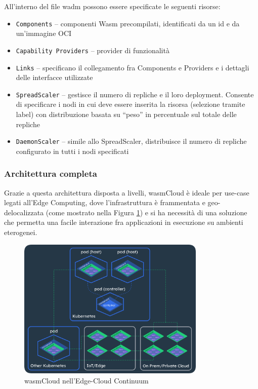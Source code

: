 All'interno del file wadm possono essere specificate le seguenti risorse:
\begin{itemize}
    \item \texttt{Components} -- componenti Wasm precompilati, identificati da un id e da un'immagine OCI
    \item \texttt{Capability Providers} -- provider di funzionalità
    \item \texttt{Links} -- specificano il collegamento fra Components e Providers e i dettagli delle interfacce utilizzate
    \item \texttt{SpreadScaler} -- gestisce il numero di repliche e il loro deployment. Consente di specificare i nodi in cui deve essere inserita la risorsa (selezione tramite label) con distribuzione basata su ``peso'' in percentuale sul totale delle repliche
    \item \texttt{DaemonScaler} -- simile allo SpreadScaler, distribuisce il numero di repliche configurato in tutti i nodi specificati
\end{itemize}

\subsubsection{Architettura completa}

Grazie a questa architettura disposta a livelli, wasmCloud è ideale per use-case legati all'Edge Computing, dove l'infrastruttura è frammentata e geo-delocalizzata (come mostrato nella Figura \ref{fig:wasmcloud_edge}) e si ha necessità di una soluzione che permetta una facile interazione fra applicazioni in esecuzione su ambienti eterogenei.

\FloatBarrier
\begin{figure}[h]
    \centering
    \includegraphics[width=0.8\textwidth]{img/wasmcloud_kube.png}
    \caption{wasmCloud nell'Edge-Cloud Continuum\protect\footnotemark}
    \label{fig:wasmcloud_edge}
\end{figure}
\FloatBarrier
{}

